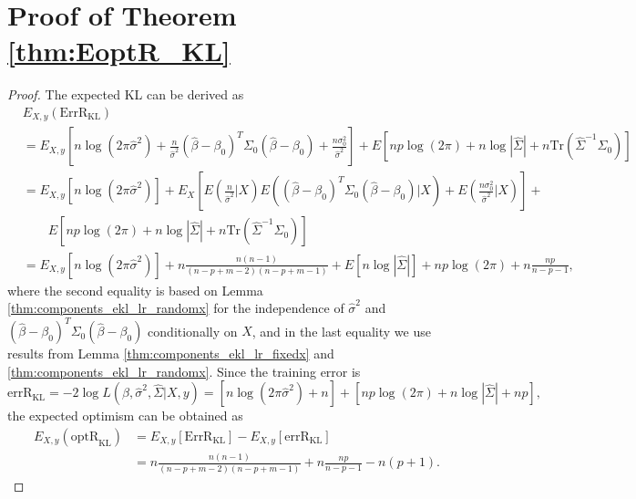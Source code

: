 \section{Proof of Theorem \ref{thm:EoptR_KL}}
\begin{proof}
The expected KL can be derived as
\begin{equation*}
\begin{aligned}
&E_{X,y} (\text{ErrR}_\text{KL}) \\
&= E_{X,y} \left [ n \log (2\pi \hat\sigma^2) + \frac{n}{\hat\sigma^2}  (\hat\beta-\beta_0)^T \Sigma_0 (\hat\beta-\beta_0) + \frac{n\sigma_0^2}{\hat\sigma^2} \right ] + E \left [np \log(2\pi) + n \log |\hat\Sigma| + n \text{Tr}(\hat\Sigma^{-1}\Sigma_{0}) \right] \\
&= E_{X,y} \left [ n \log (2\pi \hat\sigma^2) \right ] + E_X \left[E\left(\frac{n}{\hat\sigma^2} \big | X \right)  E\left((\hat\beta-\beta_0)^T \Sigma_0 (\hat\beta-\beta_0) \big| X \right) + E\left(\frac{n\sigma_0^2}{\hat\sigma^2} \big| X \right) \right] + \\
 & \qquad E \left [np \log(2\pi) + n \log |\hat\Sigma| + n \text{Tr}(\hat\Sigma^{-1}\Sigma_{0}) \right] \\
&= E_{X,y} \left [ n\log (2\pi \hat \sigma^2) \right ] +  n \frac{n(n-1)}{(n-p+m-2)(n-p+m-1)} + E \left [ n\log |\hat \Sigma| \right ] + np\log(2\pi) + n \frac{np}{n-p-1},
\end{aligned}
\end{equation*}
where the second equality is based on Lemma \ref{thm:components_ekl_lr_randomx} for the independence of $\hat\sigma^2$ and $(\hat\beta-\beta_0)^T \Sigma_0 (\hat\beta-\beta_0)$ conditionally on $X$, and in the last equality we use results from Lemma \ref{thm:components_ekl_lr_fixedx} and \ref{thm:components_ekl_lr_randomx}. Since the training error is
\begin{equation*}
\text{errR}_\text{KL} = -2\log L(\hat\beta,\hat\sigma^2,\hat\Sigma|X,y) = \left [ n \log (2\pi \hat\sigma^2) + n \right ] + \left [np \log(2\pi) + n \log |\hat\Sigma| + np \right ],
\end{equation*}
the expected optimism can be obtained as
\begin{equation*}
\begin{aligned}
E_{X,y}(\text{optR}_\text{KL}) 
&= E_{X,y}[\text{ErrR}_\text{KL} ]  -  E_{X,y}[\text{errR}_\text{KL} ] \\
&= n \frac{n(n-1)}{(n-p+m-2)(n-p+m-1)} + n \frac{np}{n-p-1} - n(p+1).
\end{aligned}
\end{equation*}
\end{proof}


